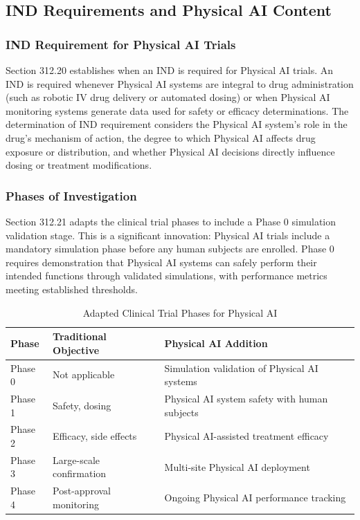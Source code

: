 \subsection{IND Requirements and Physical AI Content}
\label{subsec:cfr312-ind}

\subsubsection{IND Requirement for Physical AI Trials}

Section 312.20 establishes when an IND is required for Physical AI trials. An
IND is required whenever Physical AI systems are integral to drug
administration (such as robotic IV drug delivery or automated dosing) or when
Physical AI monitoring systems generate data used for safety or efficacy
determinations. The determination of IND requirement considers the Physical AI
system's role in the drug's mechanism of action, the degree to which Physical
AI affects drug exposure or distribution, and whether Physical AI decisions
directly influence dosing or treatment modifications.

\subsubsection{Phases of Investigation}

Section 312.21 adapts the clinical trial phases to include a Phase 0 simulation
validation stage. This is a significant innovation: Physical AI trials include
a mandatory simulation phase before any human subjects are enrolled. Phase 0
requires demonstration that Physical AI systems can safely perform their
intended functions through validated simulations, with performance metrics
meeting established thresholds.

\begin{table}[H]
\centering
\caption{Adapted Clinical Trial Phases for Physical AI}
\label{tab:trial-phases}
\small
\begin{tabularx}{\textwidth}{l X X}
\toprule
\textbf{Phase} & \textbf{Traditional Objective} & \textbf{Physical AI Addition} \\
\midrule
Phase 0 & Not applicable & Simulation validation of Physical AI systems \\
Phase 1 & Safety, dosing & Physical AI system safety with human subjects \\
Phase 2 & Efficacy, side effects & Physical AI-assisted treatment efficacy \\
Phase 3 & Large-scale confirmation & Multi-site Physical AI deployment \\
Phase 4 & Post-approval monitoring & Ongoing Physical AI performance tracking \\
\bottomrule
\end{tabularx}
\end{table}

